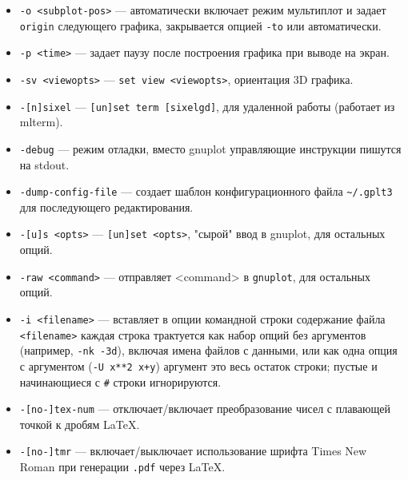 \documentclass[12pt]{article}
\def\gnuplot{{\tt gnuplot}}
\begin{document}
\begin{itemize}
\verb'd|u' (\verb'downwards|upwards' заполнение колонок происходит сверху вниз или снизу вверх).
Другие необязательные аргументы \verb'layout' задаются в произвольном порядке:
\begin{itemize}
\item  \verb'm<left>,<right>,<bottom>,<top>' --- опция \verb'margins', устанавливает поля;
\item  \verb'sс<scale_x>[,<scale_y>]' --- масштабирование графиков по горизонтали и вертикали;
\item  \verb'o<offset_x>[,<offset_y>]' --- смещение графиков в единицах размера листа;
\item  \verb'sp<xspacing>[,<yspacing>]' --- расстояние между графиками.
\end{itemize}
\item \verb'-o <subplot-pos>' --- автоматически включает режим мультиплот и задает \verb'origin'
   следующего графика, закрывается опцией \verb'-to' или автоматически.
\item \verb'-p <time>' --- задает паузу после построения графика при выводе на экран.
\item \verb'-sv <viewopts>' --- \verb'set view <viewopts>', ориентация 3D графика.
\item \verb'-[n]sixel' --- \verb'[un]set term [sixelgd]', для удаленной работы (работает из mlterm).
\item \verb'-debug' --- режим отладки, вместо gnuplot управляющие инструкции пишутся на stdout.
\item \verb'-dump-config-file' --- создает шаблон конфигурационного файла \verb'~/.gplt3' для последующего редактирования.
\item \verb'-[u]s <opts>' --- \verb'[un]set <opts>', "сырой" ввод в gnuplot, для остальных опций.
\item \verb'-raw <command>' --- отправляет <command> в \gnuplot{}, для остальных опций.
\item \verb'-i <filename>' --- вставляет в опции командной строки содержание файла \verb'<filename>'
   каждая строка трактуется как набор опций без аргументов (например, \verb'-nk -3d'), 
   включая имена файлов с данными, или как одна опция с аргументом (\verb'-U x**2 x+y')
   аргумент это весь остаток строки; пустые и начинающиеся с \verb'#' строки игнорируются.
\item \verb'-[no-]tex-num' --- отключает/включает преобразование чисел с плавающей точкой к дробям \LaTeX.
\item \verb'-[no-]tmr' --- включает/выключает использование шрифта Times New Roman при генерации \verb'.pdf' через \LaTeX.
\end{itemize}
\end{document}
